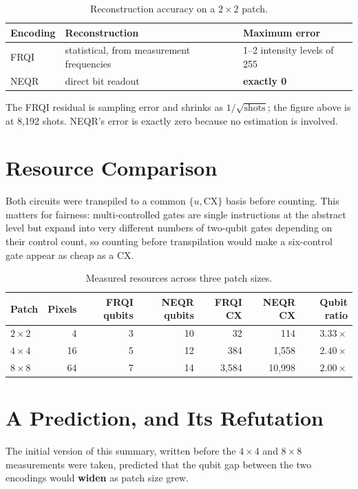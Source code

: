 \documentclass[11pt,a4paper]{article}
\begin{document}
\begin{table}[h]
\centering
\caption{Reconstruction accuracy on a $2\times2$ patch.}
\begin{tabular}{@{}lll@{}}
\toprule
Encoding & Reconstruction & Maximum error \\
\midrule
FRQI & statistical, from measurement frequencies & 1--2 intensity levels of 255 \\
NEQR & direct bit readout & \textbf{exactly 0} \\
\bottomrule
\end{tabular}
\end{table}

The FRQI residual is sampling error and shrinks as $1/\sqrt{\text{shots}}$; the
figure above is at 8{,}192 shots. NEQR's error is exactly zero because no
estimation is involved.

\section{Resource Comparison}

Both circuits were transpiled to a common $\{u, \mathrm{CX}\}$ basis before
counting. This matters for fairness: multi-controlled gates are single
instructions at the abstract level but expand into very different numbers of
two-qubit gates depending on their control count, so counting before
transpilation would make a six-control gate appear as cheap as a CX.

\begin{table}[h]
\centering
\caption{Measured resources across three patch sizes.}
\begin{tabular}{@{}lrrrrrr@{}}
\toprule
Patch & Pixels & FRQI qubits & NEQR qubits & FRQI CX & NEQR CX & Qubit ratio \\
\midrule
$2\times2$ & 4 & 3 & 10 & 32 & 114 & $3.33\times$ \\
$4\times4$ & 16 & 5 & 12 & 384 & 1{,}558 & $2.40\times$ \\
$8\times8$ & 64 & 7 & 14 & 3{,}584 & 10{,}998 & $2.00\times$ \\
\bottomrule
\end{tabular}
\end{table}

\section{A Prediction, and Its Refutation}

The initial version of this summary, written before the $4\times4$ and $8\times8$
measurements were taken, predicted that the qubit gap between the two encodings
would \textbf{widen} as patch size grew.
\end{document}
